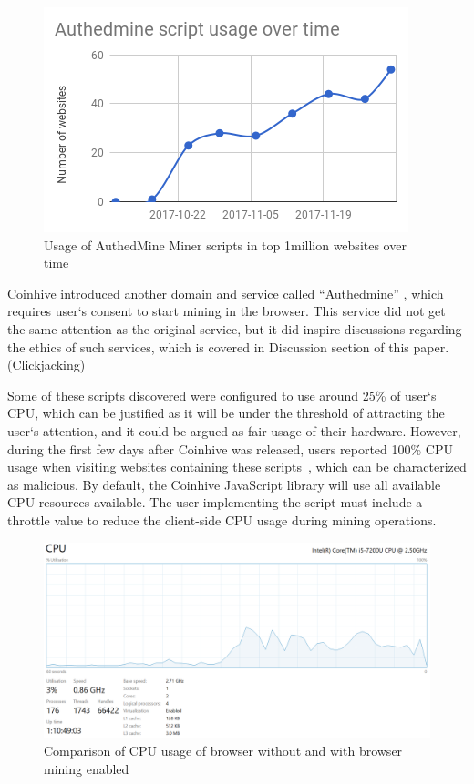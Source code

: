 \begin{figure}[t]
\centering
\includegraphics[width=\linewidth]{figures/usage_of_authedmine_over_time.png}
	\caption{Usage of AuthedMine Miner scripts in top 1million websites over time}
\end{figure}

Coinhive introduced another domain and service called ``Authedmine'' , which requires user`s consent to start mining in the browser. This service did not get the same attention as the original service, but it did inspire discussions regarding the ethics of such services, which is covered in Discussion section of this paper. (Clickjacking) 

Some of these scripts discovered were configured to use around 25\% of user`s CPU, which can be justified as it will be under the threshold of attracting the user`s attention, and it could be argued as fair-usage of their hardware. However, during the first few days after Coinhive was released, users reported 100\% CPU usage when visiting websites containing these scripts~\cite{piratesbayblog}, which can be characterized as malicious. By default, the Coinhive JavaScript library will use all available CPU resources available. The user implementing the script must include a throttle value to reduce the client-side CPU usage during mining operations.


\begin{figure}[t]
\centering
\includegraphics[width=\linewidth]{figures/windows_cpu_usage.png}
	\caption{Comparison of CPU usage of browser without and with browser mining enabled}
\end{figure}

